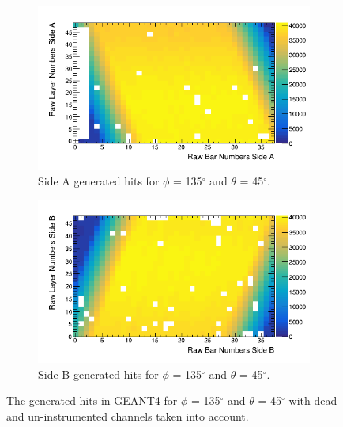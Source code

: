 \begin{figure}[!h]
\centering
\begin{subfigure}{.5\textwidth}
  \centering
  \includegraphics[width=\linewidth]{Chapter5/Figs/cosmicTrackerUncertainties/sideAGen_PVsT_135_45.png}
  \captionsetup{width=.9\linewidth}
  \caption{Side A generated hits for $\phi$ =  135$^\circ$ and $\theta$ = 45$^\circ$.}
  \label{subFig:sideAGen_PVsT_135_45}
\end{subfigure}%
\begin{subfigure}{.5\textwidth}
  \centering
\includegraphics[width=\linewidth]{Chapter5/Figs/cosmicTrackerUncertainties/sideBGen_PVsT_135_45.png}
  \captionsetup{width=.9\linewidth}
  \caption{Side B generated hits for $\phi$ = 135$^\circ$ and $\theta$ = 45$^\circ$.}
  \label{subFig:sideBGen_PVsT_135_45}
\end{subfigure}
\caption{The generated hits in GEANT4 for $\phi$ = 135$^\circ$ and $\theta$ = 45$^\circ$ with dead and un-instrumented channels taken into account.}
\label{fig:sideABGen_PVsT_135_45}
\end{figure}

